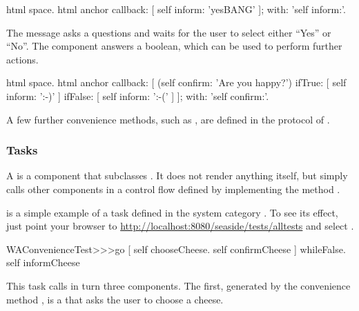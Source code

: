 \documentclass[a4paper,10pt,twoside]{book}
\begin{document}
\begin{code}{}
html space.
html anchor
	callback: [ self inform: 'yesBANG' ];
	with: 'self inform:'.
\end{code}

The message  asks a questions and waits for the user to select either ``Yes'' or ``No''.
The component answers a boolean, which can be used to perform further actions.

\begin{code}{}
html space.
html anchor
	callback: [
		(self confirm: 'Are you happy?')
			ifTrue: [ self inform: ':-)' ]
			ifFalse: [ self inform: ':-(' ]
		];
	with: 'self confirm:'.
\end{code}

A few further convenience methods, such as , are defined in the  protocol of .


\subsubsection{Tasks}

A  is a component that subclasses .
It does not render anything itself, but simply calls other components in a control flow defined by implementing the method . 

 is a simple example of a task defined in the system category .
To see its effect, just point your browser to \url{http://localhost:8080/seaside/tests/alltests} and select .

\begin{code}{}
WAConvenienceTest>>>go
	[ self chooseCheese.
	  self confirmCheese ] whileFalse.
	self informCheese
\end{code}

This task calls in turn three components.
The first, generated by the convenience method , is a  that asks the user to choose a cheese.
\end{document}
